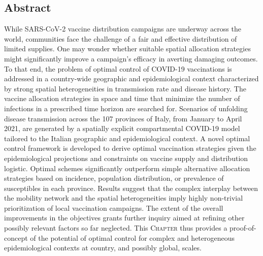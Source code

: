 \begin{fullwidth}
\section{Abstract}
While SARS-CoV-2 vaccine distribution campaigns are underway across the world, communities face the challenge of a fair and effective distribution of limited supplies. One may wonder whether suitable spatial allocation strategies might significantly improve a campaign's efficacy in averting damaging outcomes. To that end, the problem of optimal control of COVID-19 vaccinations is addressed in a country-wide geographic and epidemiological context characterized by strong spatial heterogeneities in transmission rate and disease history. The vaccine allocation strategies in space and time that minimize the number of infections in a prescribed time horizon are searched for. Scenarios of unfolding disease transmission across the 107 provinces of Italy, from January to April 2021, are generated by a spatially explicit compartmental COVID-19 model tailored to the Italian geographic and epidemiological context. A novel optimal control framework is developed to derive optimal vaccination strategies given the epidemiological projections and constraints on vaccine supply and distribution logistic. Optimal schemes significantly outperform simple alternative allocation strategies based on incidence, population distribution, or prevalence of susceptibles in each province. Results suggest that the complex interplay between the mobility network and the spatial heterogeneities imply highly non-trivial prioritization of local vaccination campaigns. The extent of the overall improvements in the objectives grants further inquiry aimed at refining other possibly relevant factors so far neglected. This \textsc{Chapter} thus provides a proof-of-concept of the potential of optimal control for complex and heterogeneous epidemiological contexts at country, and possibly global, scales.
\end{fullwidth}

